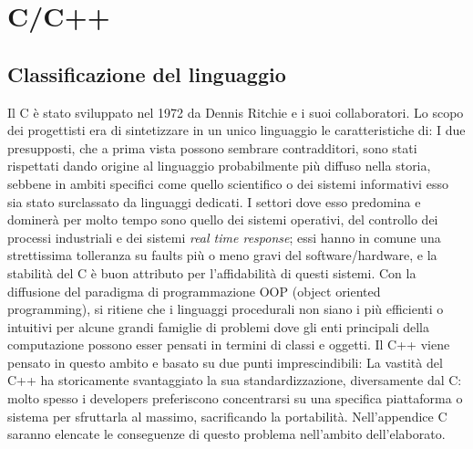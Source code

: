 \section{C/C++}
	\subsection{Classificazione del linguaggio} %
Il C è stato sviluppato nel 1972 da Dennis Ritchie e i suoi collaboratori. Lo scopo dei progettisti era di sintetizzare in un unico linguaggio le caratteristiche di: 
I due presupposti, che a prima vista possono sembrare contradditori, sono stati rispettati dando origine al linguaggio probabilmente più diffuso nella storia, sebbene in ambiti specifici come quello scientifico o dei sistemi informativi esso sia stato surclassato da linguaggi dedicati. I settori dove esso predomina e dominerà per molto tempo sono quello dei sistemi operativi, del controllo dei processi industriali e dei sistemi {\em real time response}; essi hanno in comune una strettissima tolleranza su faults più o meno gravi del software/hardware, e la stabilità del C è buon attributo per l'affidabilità di questi sistemi.
Con la diffusione del paradigma di programmazione OOP (object oriented programming), si ritiene che i linguaggi procedurali non siano i più efficienti o intuitivi per alcune grandi famiglie di problemi dove gli enti principali della computazione possono esser pensati in termini di classi e oggetti. Il C++ viene pensato in questo ambito e basato su due punti imprescindibili: 
La vastità del C++ ha storicamente svantaggiato la sua standardizzazione, diversamente dal C: molto spesso i developers preferiscono concentrarsi su una specifica piattaforma o sistema per sfruttarla al massimo, sacrificando la portabilità. Nell'appendice C saranno elencate le conseguenze di questo problema nell'ambito dell'elaborato.
